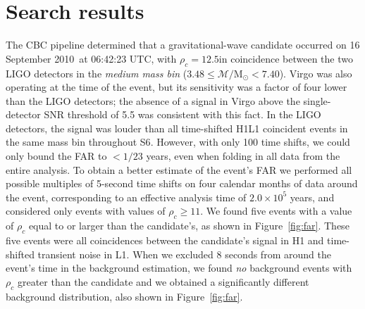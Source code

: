 \documentclass[prd,superscriptaddress,showpacs,amssymb,amsmath,amsfonts,aps,altaffilletter,nofootinbib,letterpaper,twocolumn]{revtex4}
\def\Msun{\ensuremath{\mathrm{M_{\odot}}}}
\def\12to18{Abbott:2009qj}
\def\dogDate{16 September 2010}
\def\recoveredDogTime{06:42:23 UTC}
\def\dogSNR{\ensuremath{\rho_c = 12.5}}
\begin{document}

\section{Search results}
\label{sec:results}

The \ac{CBC} pipeline determined that a gravitational-wave candidate occurred
on \dogDate~at \recoveredDogTime, with \dogSNR in
coincidence between the two LIGO detectors in the {\it medium mass bin} ($3.48
\le \mathcal{M}/\Msun < 7.40$).  Virgo was also operating at the time of the
event, but its sensitivity was a factor of four lower than the LIGO detectors;
the absence of a signal in Virgo above the single-detector SNR threshold of 5.5
was consistent with this fact.  In the LIGO detectors, the signal was louder
than all time-shifted H1L1 coincident events in the same mass bin throughout
\ac{S6}. However, with only 100 time shifts, we could only bound the FAR to $<
1/23$ years, even when folding in all data from the entire analysis. To obtain
a better estimate of the event's FAR we performed all possible multiples of
5-second time shifts on four calendar months of data around the event,
corresponding to an effective analysis time of $2.0\times 10^5$
years, and considered only events with values of $\rho_{c} \ge 11$.  We found
five events with a value of $\rho_c$ equal to or larger than the
candidate's, as shown in Figure~\ref{fig:far}.  These five events were all
coincidences between the candidate's signal in H1 and time-shifted transient
noise in L1.  When we excluded 8 seconds from around the event's time in the
background estimation, we found {\em no}\/ background events with $\rho_c$
greater than the candidate and we obtained a significantly different background
distribution, also shown in Figure~\ref{fig:far}. 
\end{document}
